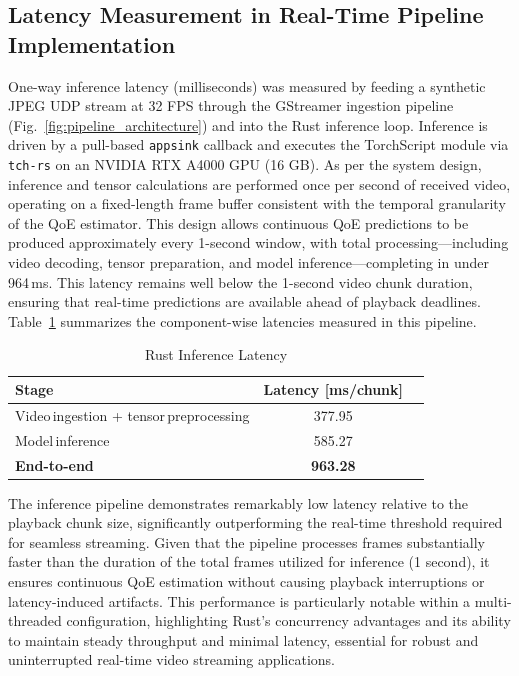 \subsection{Latency Measurement in Real-Time Pipeline Implementation}
\label{sec:throughput_latency}

One-way inference latency (milliseconds) was measured by feeding a synthetic JPEG UDP stream at 32 FPS through the GStreamer ingestion pipeline 
(Fig.~\ref{fig:pipeline_architecture}) and into the Rust inference loop. Inference is driven by a pull-based \texttt{appsink} callback and executes the 
TorchScript module via \texttt{tch-rs} on an NVIDIA RTX A4000 GPU (16 GB). As per the system design, inference and tensor calculations are performed once 
per second of received video, operating on a fixed-length frame buffer consistent with the temporal granularity of the QoE estimator. This design allows continuous 
QoE predictions to be produced approximately every 1-second window, with total processing—including video decoding, tensor preparation, and model inference—completing 
in under 964\,ms. This latency remains well below the 1-second video chunk duration, ensuring that real-time predictions are available ahead of playback deadlines. 
Table~\ref{tab:throughput_latency} summarizes the component-wise latencies measured in this pipeline.


\begin{table}[h]
  \centering
  \caption{Rust Inference Latency}
  \label{tab:throughput_latency}
  \begin{tabular}{lcc}
    \toprule
    Stage                 & Latency [ms/chunk] \\
    \midrule
    Video\,ingestion + tensor\,preprocessing & 377.95 \\
    Model\,inference            & 585.27 \\
    \textbf{End-to-end}         & \textbf{963.28} \\
    \bottomrule
  \end{tabular}
\end{table}

The inference pipeline demonstrates remarkably low latency relative to the playback chunk size, significantly outperforming the real-time 
threshold required for seamless streaming. Given that the pipeline processes frames substantially faster than the duration of the total frames 
utilized for inference (1 second), it ensures continuous QoE estimation without causing playback interruptions or latency-induced artifacts. 
This performance is particularly notable within a multi-threaded configuration, highlighting Rust's concurrency advantages and its ability to 
maintain steady throughput and minimal latency, essential for robust and uninterrupted real-time video streaming applications.

